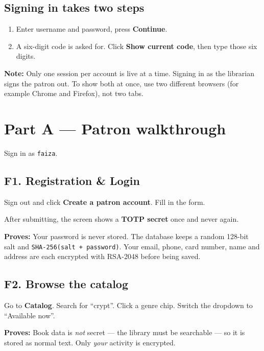 \documentclass[11pt]{article}
\newcommand{\proof}[1]{\textcolor{ok}{\textbf{Proves:}} #1}
\newcommand{\note}[1]{\textcolor{warn}{\textbf{Note:}} #1}
\begin{document}
\subsection*{Signing in takes two steps}

\begin{enumerate}[leftmargin=1.4cm, itemsep=2pt]
  \item Enter username and password, press \textbf{Continue}.
  \item A six-digit code is asked for. Click \textbf{Show current code},
        then type those six digits.
\end{enumerate}

\note{Only one session per account is live at a time. Signing in as the
librarian signs the patron out. To show both at once, use two different
browsers (for example Chrome and Firefox), not two tabs.}

\section{Part A --- Patron walkthrough}

Sign in as \texttt{faiza}.

\subsection*{F1. Registration \& Login}

Sign out and click \textbf{Create a patron account}. Fill in the form.

After submitting, the screen shows a \textbf{TOTP secret} once and never again.

\proof{Your password is never stored. The database keeps a random 128-bit salt
and \texttt{SHA-256(salt + password)}. Your email, phone, card number, name and
address are each encrypted with RSA-2048 before being saved.}

\subsection*{F2. Browse the catalog}

Go to \textbf{Catalog}. Search for ``crypt''. Click a genre chip. Switch the
dropdown to ``Available now''.

\proof{Book data is \emph{not} secret --- the library must be searchable --- so
it is stored as normal text. Only \emph{your} activity is encrypted.}
\end{document}
